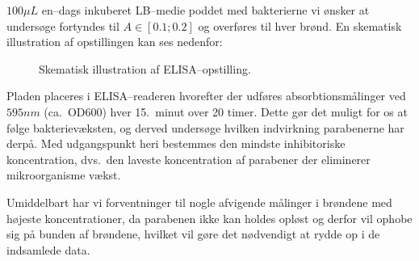     $100\si{\mu L}$ en--dags inkuberet LB--medie poddet med bakterierne vi ønsker at undersøge fortyndes til $A \in \left[0.1;0.2\right]$ og overføres til hver brønd. En skematisk illustration af opstillingen kan ses nedenfor:
    \begin{figure}[H]\centering
        \caption{Skematisk illustration af ELISA--opstilling.}
    \end{figure}
    Pladen placeres i ELISA--readeren hvorefter der udføres absorbtionsmålinger ved $595\si{nm}$ (ca.\ OD600) hver 15.\ minut over 20 timer. Dette gør det muligt for os at følge bakterievæksten, og derved undersøge hvilken indvirkning parabenerne har derpå. Med udgangspunkt heri bestemmes den mindste inhibitoriske koncentration, dvs.\ den laveste koncentration af parabener der eliminerer mikroorganisme vækst.

    Umiddelbart har vi forventninger til nogle afvigende målinger i brøndene med højeste koncentrationer, da parabenen ikke kan holdes opløst og derfor vil ophobe sig på bunden af brøndene, hvilket vil gøre det nødvendigt at rydde op i de indsamlede data.
